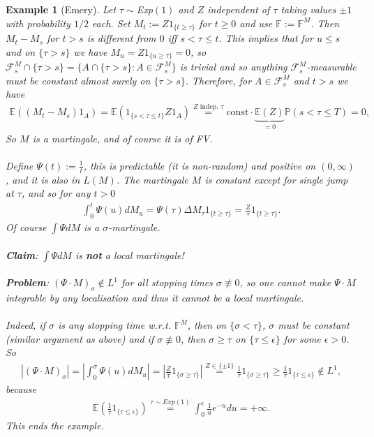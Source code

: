 \documentclass[12pt,a4paper, twoside]{article}
\newtheorem{exmp}{Example}[section]
\theoremstyle{definition}
\newcommand{\EE}{\mathbb{E}} %
\newcommand{\PP}{\mathbb{P}} %
\begin{document}
\newpage
\begin{exmp}[Emery] Let $\tau \sim $Exp$(1)$ and $Z$ independent of $\tau$ taking values $\pm 1$ with probability $1/2$ each. Set $M_t:= Z 1_{\{ t \geq \tau\}}$ for $t \geq 0$ and use $\mathbb{F}:= \mathbb{F}^M$. Then $M_t-M_s$ for $t > s$ is different from $0$ iff $s < \tau \leq t$. This implies that for $u \leq s$ and on $\{ \tau >s\}$ we have $M_u = Z 1_{\{u \geq \tau\}}=0$, so $\mathcal{F}_s^M \cap \{ \tau >s \}= \{ A \cap \{ \tau >s\}: A \in \mathcal{F}_s^M\}$ is trivial and so anything $\mathcal{F}_s^M$-measurable must be constant almost surely on $\{ \tau > s\}$. Therefore, for $A \in \mathcal{F}_s^M$ and $t >s$ we have
\begin{align*}
\EE((M_t-M_s)1_A)=\EE(1_{\{s < \tau \leq t\}} Z 1_A) \overset{Z \text{ indep. } \tau}{=} \text{const} \cdot \underbrace{\EE(Z)}_{=0} \PP( s < \tau \leq T) =0, 
\end{align*}
So $M$ is  a martingale, and of course it is of FV.
\\\\
Define $\Psi(t):= \frac{1}{t}$, this is predictable (it is non-random) and positive on $(0, \infty)$, and it is also in $L(M)$. The martingale $M$ is constant except for single jump at $\tau$, and so for any $t >0$ 
\begin{align*}
\int_0^t \Psi(u) dM_u = \Psi( \tau) \Delta M_\tau 1_{\{ t \geq \tau\}} = \frac{Z}{\tau}1_{\{ t \geq \tau\}}.
\end{align*}
Of course $\int \Psi dM$ is a $\sigma$-martingale. 
\\\\
\textbf{Claim}: $\int \Psi dM$ is \textbf{not} a local martingale!
\\\\
\textbf{Problem}: $( \Psi \cdot M)_\sigma \notin L^1$ for all stopping times $\sigma \not\equiv 0$, so one cannot make $\Psi \cdot M$ integrable by any localisation and thus it cannot be a local martingale. 
\\\\
Indeed, if $\sigma$ is any stopping time w.r.t. $\mathbb{F}^M$, then on $\{ \sigma < \tau\}$, $\sigma$ must be constant (similar argument as above) and if $\sigma \not\equiv 0$, then $\sigma \geq \tau$ on $\{\tau \leq \epsilon\}$ for some $\epsilon >0$. So
\begin{align*}
\left| ( \Psi \cdot M )_\sigma \right| = \left| \int_0^\sigma \Psi(u) dM_u \right| = \left| \frac{Z}{\tau}1_{\{ \sigma \geq \tau\}} \right| \overset{Z \in \{\pm 1\}}= \frac{1}{\tau} 1_{\{ \sigma \geq \tau\}} \geq \frac{1}{\tau}1_{\{ \tau \leq \epsilon\}} \notin L^1,
\end{align*}
because
\begin{align*}
\EE \left( \frac{1}{\tau}1_{\{ \tau \leq \epsilon\}} \right) \overset{ \tau \sim Exp(1)}= \int_0^\epsilon \frac{1}{u}e^{-u} du = + \infty.
\end{align*}
This ends the example.
\end{exmp}
\end{document}
